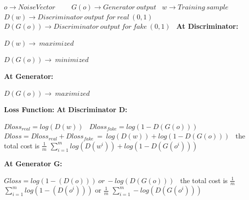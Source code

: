 \documentclass[runningheads]{llncs}
\begin{document}
\begin{itemize}
    $o\rightarrow Noise Vector$\ ~~~ $G(o)\rightarrow Generator~  output$\
    \newline
    $w\rightarrow Training~sample$\ 
    \newline
    $D(w)\rightarrow Discriminator~ output~ for~ real ~(0,1) $\
    \newline
    $D(G(o))\rightarrow Discriminator~ output~ for~ fake ~(0,1) $\
    \newline
    \newline
    \textbf{At Discriminator:}
    \newline
    \newline
    \newline
    \textbf{At Generator:}
    \begin{itemize}
        \newline
        $D(G(o))\rightarrow ~maximized$\
    \end{itemize}
    
\end{itemize}
\textbf{Loss Function:}
\newline
\textbf{At Discriminator D:}
\newline
\begin{itemize}
$Dloss_{real}=log(D(w))$\
\newline
$Dloss_{fake}=log(1-D(G(o)))$\
\newline
$Dloss=Dloss_{real}+Dloss_{fake}~=~log(D(w))+log(1-D(G(o)))$\
\newline
the total cost is 
\newline
\( \frac{1}{m} \) $\sum_{i=1}^{m} log(D(w^i))+log(1-D(G(o^i)))$ 
\end{itemize}
\newline
\newline
\textbf{At Generator G:}
\newline
\begin{itemize}
$Gloss=log(1-(D(o))) ~or~ -log(D(G(o)))$\
\newline
the total cost is 
\newline
\( \frac{1}{m} \) $\sum_{i=1}^{m} log(1-(D(o^i)))$
or
\newline
\newline
\( \frac{1}{m} \) $\sum_{i=1}^{m} -log(D(G(o^i)))$
\end{itemize}
\end{document}
